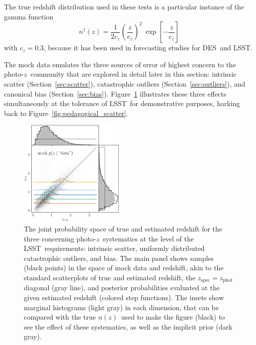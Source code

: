 \documentclass[iop]{emulateapj}
\newcommand{\todo}[3]{{\color{#2}\emph{#1}: #3}}
\newcommand{\aim}[1]{\todo{AIM}{red}{#1}}
\newcommand{\Sect}[1]{Section~\ref{#1}}
\newcommand{\Fig}[1]{Figure~\ref{#1}}
\newcommand{\project}[1]{\textsc{#1}}
\newcommand{\lsst}{\project{LSST}}
\newcommand{\des}{\project{DES}}
\newcommand{\pz}{photo-$z$}
\newcommand{\nz}{$n(z)$}
\begin{document}
The true redshift distribution used in these tests is a particular instance of the gamma function
\begin{equation}
\label{eqn:gamma}
n^{\dagger}(z) = \frac{1}{2 c_{z}} \left(\frac{z}{c_{z}}\right)^{2}\ \exp\left[-\frac{z}{c_{z}}\right]
\end{equation}
with $c_{z} = 0.3$, because it has been used in forecasting studies for \des\ and \lsst.

The mock data emulates the three sources of error of highest concern to the \pz\ community that are explored in detail later in this section: intrinsic scatter (\Sect{sec:scatter}), catastrophic outliers (\Sect{sec:outliers}), and canonical bias (\Sect{sec:bias}).
\Fig{fig:mega_scatter} illustrates these three effects simultaneously at the tolerance of \lsst\ for demonstrative purposes, harking back to Figure~\ref{fig:pedagogical_scatter}.

\begin{figure}%
	\begin{center}
		\includegraphics[width=0.45\textwidth]{figures/chippr/single_lsst-mega_scatter.png}
		\caption{
			The joint probability space of true and estimated redshift for the three concerning \pz\ systematics at the level of the \lsst\ requirements: 
			intrinsic scatter, uniformly distributed catastrophic outliers, and bias.
			The main panel shows samples (black points) in the space of mock data and redshift, akin to the standard scatterplots of true and estimated redshift, the $z_{\mathrm{spec}} = z_{\mathrm{phot}}$ diagonal (gray line), and posterior probabilities evaluated at the given estimated redshift (colored step functions).
			The insets show marginal histograms (light gray) in each dimension, that can be compared with the true \nz\ used to make the figure (black) to see the effect of these systematics, as well as the implicit prior (dark gray).
		}
		\label{fig:mega_scatter}
	\end{center}
\end{figure}
\end{document}
